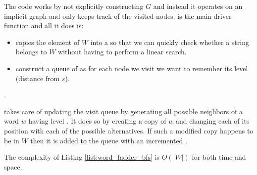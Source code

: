 

The code works by not explicitly constructing $G$ and instead it operates on an implicit graph and only keeps track of the visited nodes. 
 is the main driver function and all it does is:
\begin{itemize}
    \item copies the element of $W$ into a  so that we can quickly check whether a string belongs to $W$ without having to perform a linear search.
    \item construct a queue of  as for each node we visit we want to remember its level (distance from $s$).
\end{itemize}.

 takes care of updating the visit queue by generating all possible neighbors of a word $w$ having level . 
It does so by creating a copy of $w$ and changing each of its position with each of the possible alternatives. If such a modified copy happens to be in $W$ then it is added to the queue with an incremented .

The complexity of Listing \ref{list:word_ladder_bfs} is $O(|W|)$ for both time and space.